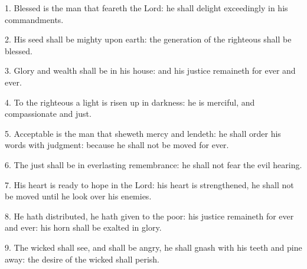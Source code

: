 1. Blessed is the man that feareth the Lord: he shall delight exceedingly in his commandments.

2. His seed shall be mighty upon earth: the generation of the righteous shall be blessed.

3. Glory and wealth shall be in his house: and his justice remaineth for ever and ever.

4. To the righteous a light is risen up in darkness: he is merciful, and compassionate and just.

5. Acceptable is the man that sheweth mercy and lendeth: he shall order his words with judgment:
because he shall not be moved for ever.

6. The just shall be in everlasting remembrance: he shall not fear the evil hearing.

7. His heart is ready to hope in the Lord: his heart is strengthened, he shall not be moved until he look over his enemies.

8. He hath distributed, he hath given to the poor: his justice remaineth for ever and ever: his horn shall be exalted in glory.

9. The wicked shall see, and shall be angry, he shall gnash with his teeth and pine away: the desire of the wicked shall perish. 